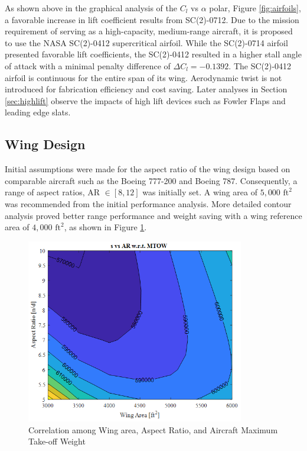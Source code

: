 As shown above in the graphical analysis of the $C_l$ vs $\alpha$ polar, Figure \ref{fig:airfoils}, a favorable increase in lift coefficient results from SC(2)-0712.  Due to the mission requirement of serving as a high-capacity, medium-range aircraft, it is proposed to use the NASA SC(2)-0412 supercritical airfoil.  While the SC(2)-0714 airfoil presented favorable lift coefficients, the SC(2)-0412 resulted in a higher stall angle of attack with a minimal penalty difference of $\Delta C_l = -0.1392$.  The SC(2)-0412 airfoil is continuous for the entire span of its wing.  Aerodynamic twist is not introduced for fabrication efficiency and cost saving.  Later analyses in Section \ref{sec:highlift} observe the impacts of high lift devices such as Fowler Flaps and leading edge slats.


\newpage
\subsection{Wing Design}
Initial assumptions were made for the aspect ratio of the wing design based on comparable aircraft such as the Boeing 777-200 and Boeing 787.  Consequently, a range of aspect ratios, AR $ \in [8,12]$ was initially set.  A wing area of $5,000 \text{ ft}^2$ was recommended from the initial performance analysis.  More detailed contour analysis proved better range performance and weight saving with a wing reference area of $4,000 \text{ ft}^2$, as shown in Figure \ref{fig:contourf}.

\begin{figure}[!h]
    \centering
    \includegraphics[width=0.85\textwidth]{Photos/aero/ARWingcontourf.png}
    \caption{Correlation among Wing area, Aspect Ratio, and Aircraft Maximum Take-off Weight}
    \label{fig:contourf}
\end{figure}

